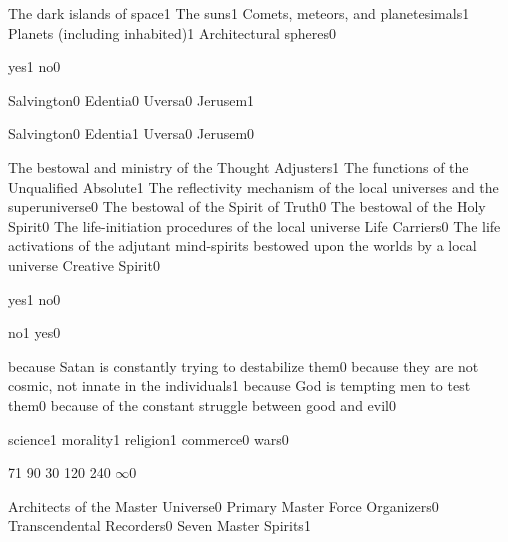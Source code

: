 {The dark islands of space}{1}
{The suns}{1}
{Comets, meteors, and planetesimals}{1}
{Planets (including inhabited)}{1}
{Architectural spheres}{0}
\qstop

{yes}{1}
{no}{0}
\qstop

{Salvington}{0}
{Edentia}{0}
{Uversa}{0}
{Jerusem}{1}
\qstop

{Salvington}{0}
{Edentia}{1}
{Uversa}{0}
{Jerusem}{0}
\qstop


{The bestowal and ministry of the Thought Adjusters}{1}
{The functions of the Unqualified Absolute}{1}
{The reflectivity mechanism of the local universes and the superuniverse}{0}
{The bestowal of the Spirit of Truth}{0}
{The bestowal of the Holy Spirit}{0}
{The life-initiation procedures of the local universe Life Carriers}{0}
{The life activations of the adjutant mind-spirits bestowed upon the worlds by a local universe Creative Spirit}{0}
\qstop

{yes}{1}
{no}{0}
\qstop

{no}{1}
{yes}{0}
\qstop

{because Satan is constantly trying to destabilize them}{0}
{because they are not cosmic, not innate in the individuals}{1}
{because God is tempting men to test them}{0}
{because of the constant struggle between good and evil}{0}
\qstop

{science}{1}
{morality}{1}
{religion}{1}
{commerce}{0}
{wars}{0}
\qstop

{7}{1}
{9}{0}
{3}{0}
{12}{0}
{24}{0}
{$\infty$}{0}
\qstop

{Architects of the Master Universe}{0}
{Primary Master Force Organizers}{0}
{Transcendental Recorders}{0}
{Seven Master Spirits}{1}
\qstop

